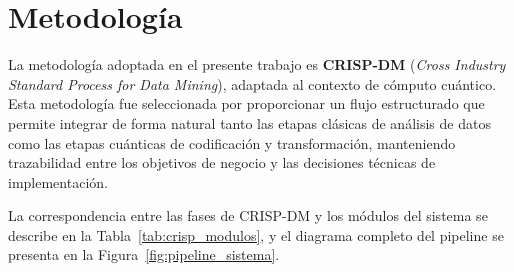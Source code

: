 
\newpage
\section{Metodología}
\label{sec:metodologia}

La metodología adoptada en el presente trabajo es
\textbf{CRISP-DM} (\textit{Cross Industry Standard Process
for Data Mining}), adaptada al contexto de cómputo cuántico.
Esta metodología fue seleccionada por proporcionar un flujo
estructurado que permite integrar de forma natural
tanto las etapas clásicas de análisis de datos como las
etapas cuánticas de codificación y transformación,
manteniendo trazabilidad entre los objetivos de negocio
y las decisiones técnicas de implementación.

La correspondencia entre las fases de CRISP-DM y los módulos
del sistema se describe en la
Tabla~\ref{tab:crisp_modulos}, y el diagrama completo del
pipeline se presenta en la
Figura~\ref{fig:pipeline_sistema}.
